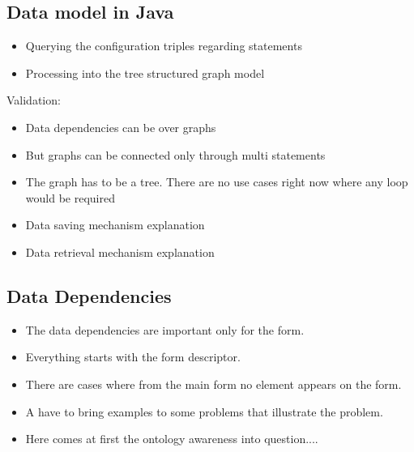 
\subsection{Data model in Java}


\begin{itemize}
	\item Querying the configuration triples regarding statements
	\item Processing into the tree structured graph model
\end{itemize}



Validation:

\begin{itemize}
	\item Data dependencies can be over graphs
	\item But graphs can be connected only through multi statements
	\item The graph has to be a tree. There are no use cases right now where any loop would be required
\end{itemize}


\begin{itemize}
	\item Data saving mechanism explanation
	\item Data retrieval mechanism explanation
\end{itemize}

\subsection{Data Dependencies}


\begin{itemize}
	\item The data dependencies are important only for the form. 
	\item Everything starts with the form descriptor.
	\item There are cases where from the main form no element appears on the form.
	\item A have to bring examples to some problems that illustrate the problem.
	\item Here comes at first the ontology awareness into question....
\end{itemize}


